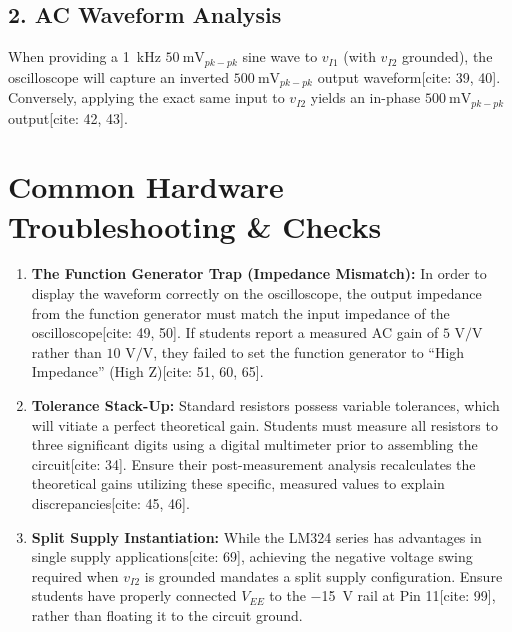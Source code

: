 \documentclass[11pt]{article}
\begin{document}
\subsection*{2. AC Waveform Analysis}
When providing a \SI{1}{\kilo\hertz} $\SI{50}{\milli\volt}_{pk-pk}$ sine wave to $v_{I1}$ (with $v_{I2}$ grounded), the oscilloscope will capture an inverted $\SI{500}{\milli\volt}_{pk-pk}$ output waveform[cite: 39, 40]. Conversely, applying the exact same input to $v_{I2}$ yields an in-phase $\SI{500}{\milli\volt}_{pk-pk}$ output[cite: 42, 43].

\vspace{0.2in}
\section*{Common Hardware Troubleshooting \& Checks}

\begin{enumerate}
  \item \textbf{The Function Generator Trap (Impedance Mismatch):} In order to display the waveform correctly on the oscilloscope, the output impedance from the function generator must match the input impedance of the oscilloscope[cite: 49, 50]. If students report a measured AC gain of $5\text{ V/V}$ rather than $10\text{ V/V}$, they failed to set the function generator to ``High Impedance'' (High Z)[cite: 51, 60, 65].
  \item \textbf{Tolerance Stack-Up:} Standard resistors possess variable tolerances, which will vitiate a perfect theoretical gain. Students must measure all resistors to three significant digits using a digital multimeter prior to assembling the circuit[cite: 34]. Ensure their post-measurement analysis recalculates the theoretical gains utilizing these specific, measured values to explain discrepancies[cite: 45, 46].
  \item \textbf{Split Supply Instantiation:} While the LM324 series has advantages in single supply applications[cite: 69], achieving the negative voltage swing required when $v_{I2}$ is grounded mandates a split supply configuration. Ensure students have properly connected $V_{EE}$ to the \SI{-15}{\volt} rail at Pin 11[cite: 99], rather than floating it to the circuit ground.
\end{enumerate}
\end{document}
